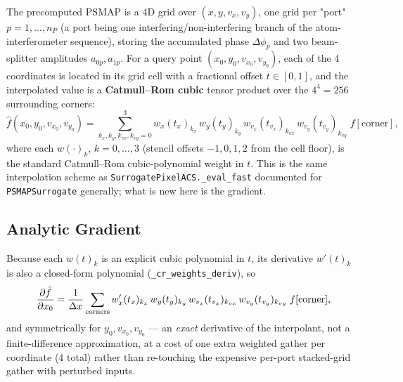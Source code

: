 \documentclass[11pt,a4paper]{article}
\newcommand{\code}[1]{\texttt{#1}}
\begin{document}
The precomputed PSMAP is a 4D grid over $(x,y,v_x,v_y)$, one grid per
"port" $p=1,\ldots,n_P$ (a port being one interfering/non-interfering
branch of the atom-interferometer sequence), storing the accumulated phase
$\Delta\phi_p$ and two beam-splitter amplitudes $a_{0p},a_{1p}$. For a query
point $(x_0,y_0,v_{x_0},v_{y_0})$, each of the 4 coordinates is located in
its grid cell with a fractional offset $t\in[0,1]$, and the interpolated
value is a \textbf{Catmull--Rom cubic} tensor product over the
$4^4=256$ surrounding corners:
\begin{equation}
  \hat f(x_0,y_0,v_{x_0},v_{y_0})
  = \sum_{k_x,k_y,k_{vx},k_{vy}=0}^{3}
    w_x(t_x)_{k_x}\,w_y(t_y)_{k_y}\,w_{v_x}(t_{v_x})_{k_{vx}}\,w_{v_y}(t_{v_y})_{k_{vy}}\;
    f[\text{corner}],
  \label{eq:cr_interp}
\end{equation}
where each $w(\cdot)_k$, $k=0,\ldots,3$ (stencil offsets $-1,0,1,2$ from the
cell floor), is the standard Catmull--Rom cubic-polynomial weight in $t$.
This is the same interpolation scheme as \code{SurrogatePixelACS.\_eval\_fast}
documented for \code{PSMAPSurrogate} generally; what is new here is the
gradient.

\subsection{Analytic Gradient}

Because each $w(t)_k$ is an explicit cubic polynomial in $t$, its derivative
$w'(t)_k$ is also a closed-form polynomial (\code{\_cr\_weights\_deriv}), so
\begin{equation}
  \frac{\partial \hat f}{\partial x_0}
  = \frac{1}{\Delta x}\sum_{\rm corners} w_x'(t_x)_{k_x}\,w_y(t_y)_{k_y}\,
    w_{v_x}(t_{v_x})_{k_{vx}}\,w_{v_y}(t_{v_y})_{k_{vy}}\; f[\text{corner}],
  \label{eq:cr_grad}
\end{equation}
and symmetrically for $y_0,v_{x_0},v_{y_0}$ --- an \emph{exact} derivative
of the interpolant, not a finite-difference approximation, at a cost of one
extra weighted gather per coordinate (4 total) rather than re-touching the
expensive per-port stacked-grid gather with perturbed inputs.
\end{document}
